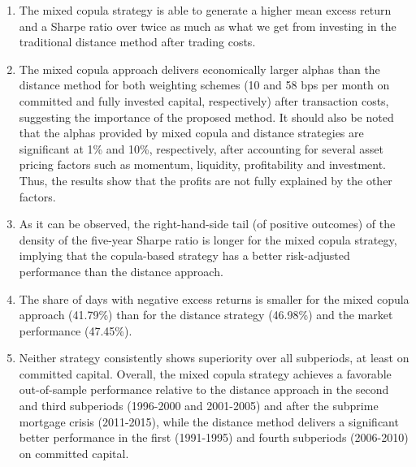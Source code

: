 \documentclass[a4paper]{article}
\begin{document}
	\begin{enumerate}
				
		
	\item The mixed copula strategy is able to generate a higher mean excess return and a Sharpe ratio over twice as much as what we get from investing in the traditional distance method after trading costs. 
	
		
		\vspace{0.3cm}
		
		\item 	The mixed copula approach delivers economically larger alphas than the distance method for both weighting schemes (10 and 58 bps per month on committed and fully invested capital, respectively) after transaction costs, suggesting the importance of the proposed method. It should also be noted that the alphas provided by mixed copula and distance strategies are significant at 1\% and 10\%, respectively, after accounting for several asset pricing factors such as momentum, liquidity, profitability and investment. Thus, the results show that the profits are not fully explained by the other factors.
		
		\vspace{0.3cm}
		
		\item As it can be observed, the right-hand-side tail (of positive outcomes) of the density of the five-year Sharpe ratio is longer for the mixed copula strategy, implying that the copula-based strategy has a better risk-adjusted performance than the distance approach.
		
		\vspace{0.3cm}
		
		\item The share of days with negative excess returns is smaller for the mixed copula approach (41.79\%) than for the distance strategy (46.98\%) and the market performance (47.45\%). 
		
	    \vspace{0.3cm}
		
		
		\item	Neither strategy consistently shows superiority over all subperiods, at least on committed capital. Overall, the mixed copula strategy achieves a favorable out-of-sample performance relative to the distance approach in the second and third subperiods (1996-2000 and 2001-2005) and after the subprime mortgage crisis (2011-2015), while the distance method delivers a significant better performance in the first (1991-1995) and fourth subperiods (2006-2010) on committed capital. 
		
	\end{enumerate}
\end{document}

